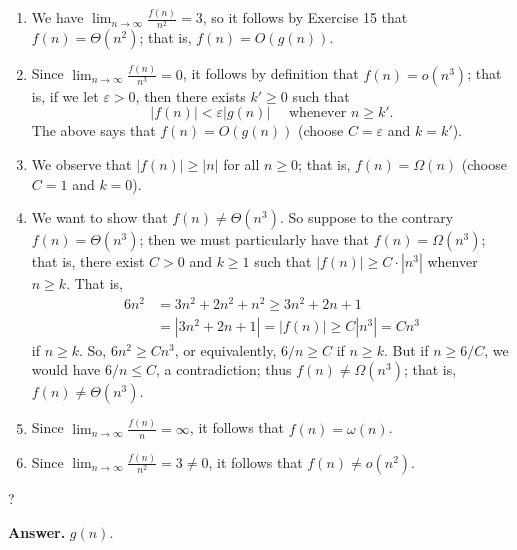 \documentclass[9pt]{article}
\begin{document}
\begin{enumerate}
      \begin{enumerate}
         \item We have $\lim_{n \rightarrow \infty}\frac{f(n)}{n^2} = 3$, so it
               follows by Exercise 15 that $f(n) = \Theta(n^2)$; that is,
               $f(n) = O(g(n))$.
         \item Since $\lim_{n \rightarrow \infty}\frac{f(n)}{n^3} = 0$, it
               follows by definition that $f(n) = o(n^3)$; that is, if we let
               $\varepsilon > 0$, then there exists $k' \ge 0$ such that
               $$|f(n)| < \varepsilon|g(n)| \quad \text{ whenever } n \ge k'.$$
               The above says that $f(n) = O(g(n))$ (choose $C = \varepsilon$
               and $k = k'$).
         \item We observe that $|f(n)| \ge |n|$ for all $n \ge 0$; that is,
               $f(n) = \Omega(n)$ (choose $C = 1$ and $k = 0$).
         \item We want to show that $f(n) \neq \Theta(n^3)$. So suppose to the 
               contrary $f(n) = \Theta(n^3)$; then we must particularly have
               that $f(n) = \Omega(n^3)$; that is, there exist $C > 0$ and
               $k \ge 1$ such that $|f(n)| \ge C \cdot |n^3|$ whenver $n \ge k$. 
               That is,
               \begin{align*}
                  6n^2 &= 3n^2 + 2n^2 + n^2 \ge 3n^2 + 2n + 1 \\
                       &= |3n^2 + 2n + 1| = |f(n)| \ge C|n^3| = Cn^3
               \end{align*}
               if $n \ge k$. So, $6n^2 \ge Cn^3$, or equivalently, $6/n \ge C$
               if $n \ge k$. But if $n \ge 6/C$,  we would have $6/n \le C$, a
               contradiction; thus $f(n) \neq \Omega(n^3)$; that is,
               $f(n) \neq \Theta(n^3)$.
         \item Since $\lim_{n \rightarrow \infty}\frac{f(n)}{n} = \infty$, it
               follows that $f(n) = \omega(n)$.
         \item Since $\lim_{n \rightarrow \infty}\frac{f(n)}{n^2} = 3 \neq 0$,
               it follows that $f(n) \neq o(n^2)$.
      \end{enumerate}
         ?

      \textbf{Answer.} $g(n)$.


\end{enumerate}
\end{document}
